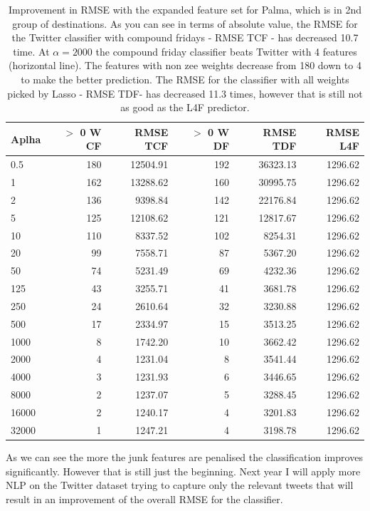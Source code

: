 \documentclass[minf,frontabs,twoside,singlespacing,parskip]{infthesis}
\begin{document}
\begin{table}[pt]
\begin{center}
\begin{tabular}{ l | r | r | r | r | r}
Aplha & $>$ 0 W CF & RMSE TCF & $>$ 0 W DF & RMSE TDF & RMSE L4F  \\
\hline
0.5 & 180 & 12504.91 & 192  & 36323.13 & 1296.62  \\
1 & 162 & 13288.62 & 160  & 30995.75 & 1296.62  \\
2 & 136 & 9398.84  & 142  & 22176.84 & 1296.62  \\
5 & 125 & 12108.62 & 121 & 12817.67 & 1296.62 \\
10 & 110 & 8337.52  & 102 & 8254.31 & 1296.62 \\
20 & 99& 7558.71 & 87 & 5367.20 & 1296.62 \\
50 & 74& 5231.49 & 69 & 4232.36 & 1296.62 \\
125 & 43 & 3255.71 & 41 & 3681.78 & 1296.62 \\
250 & 24 & 2610.64 & 32 & 3230.88 & 1296.62 \\
500 & 17 & 2334.97 & 15 & 3513.25 & 1296.62 \\
1000 & 8 & 1742.20 & 10 & 3662.42 & 1296.62 \\
\hline
2000 & 4 & 1231.04 & 8  & 3541.44 & 1296.62 \\
4000 & 3 & 1231.93 & 6 & 3446.65 & 1296.62 \\
8000 & 2 & 1237.07 & 5 & 3288.45 & 1296.62 \\
16000 & 2 & 1240.17 & 4 & 3201.83 & 1296.62 \\
32000 & 1 & 1247.21 & 4 & 3198.78 & 1296.62 \\
\end{tabular}
\end{center}
\caption{Improvement in RMSE with the expanded feature set for Palma, which is in 2nd group of destinations.  As you can see in terms of absolute value, the RMSE for the Twitter classifier with compound fridays - RMSE TCF - has decreased 10.7 time. At $\alpha=2000$ the compound friday classifier beats Twitter with 4 features (horizontal line). The features with non zee weights decrease from 180 down to 4 to make the better prediction.  The RMSE for the classifier with all weights picked by Lasso - RMSE TDF- has decreased 11.3 times, however that is still not as good as the L4F predictor.}
\end{table}

As we can see the more the junk features are penalised the classification improves significantly. However that is still just the beginning. Next year I will apply more NLP on the Twitter dataset trying to capture only the relevant tweets that will result in an improvement of the overall RMSE for the classifier. 
\end{document}
